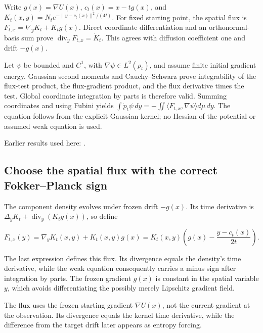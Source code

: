 \documentclass[11pt,a4paper]{report}
\begin{document}
Write \(g(x)=\nabla U(x)\), \(c_t(x)=x-tg(x)\), and \(K_t(x,y)=N_t e^{-\|y-c_t(x)\|^2/(4t)}\). For fixed starting point, the spatial flux is \(F_{t,x}=\nabla_yK_t+K_tg(x)\). Direct coordinate differentiation and an orthonormal-basis sum prove \(\operatorname{div}_yF_{t,x}=\dot K_t\). This agrees with diffusion coefficient one and drift \(-g(x)\).



Let \(\psi\) be bounded and \(C^1\), with \(\nabla\psi\in L^2(\rho_t)\), and assume finite initial gradient energy. Gaussian second moments and Cauchy–Schwarz prove integrability of the flux-test product, the flux-gradient product, and the flux derivative times the test. Global coordinate integration by parts is therefore valid. Summing coordinates and using Fubini yields \(\int\dot p_t\psi\,dy=-\iint\langle F_{t,x},\nabla\psi\rangle d\mu\,dy\). The equation follows from the explicit Gaussian kernel; no Hessian of the potential or assumed weak equation is used.



Earlier results used here: \cite[Section~3.38]{LangevinLean2026ULASC}.
\subsection{\texorpdfstring{Choose the spatial flux with the correct Fokker–Planck sign}{Choose the spatial flux with the correct Fokker–Planck sign}}
\label{report-step-UnadjustedLangevin-LSI-GaussianWeakEquation-lean-1}


The component density evolves under frozen drift \(-g(x)\). Its time derivative is \(\Delta_yK_t+\operatorname{div}_y(K_tg(x))\), so define

\[F_{t,x}(y)=\nabla_yK_t(x,y)+K_t(x,y)g(x)=K_t(x,y)\left(g(x)-\frac{y-c_t(x)}{2t}\right).\]

The last expression defines this flux. Its divergence equals the density's time derivative, while the weak equation consequently carries a minus sign after integration by parts. The frozen gradient \(g(x)\) is constant in the spatial variable \(y\), which avoids differentiating the possibly merely Lipschitz gradient field.



The flux uses the frozen starting gradient \(\nabla U(x)\), not the current gradient at the observation. Its divergence equals the kernel time derivative, while the difference from the target drift later appears as entropy forcing.
\end{document}
